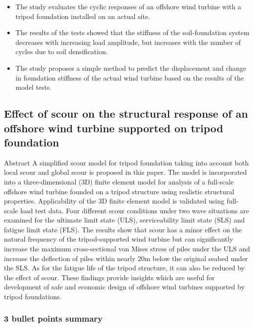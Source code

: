 \documentclass[
  letterpaper,
  DIV=11,
  numbers=noendperiod]{scrreprt}
\providecommand{\tightlist}{%
  \setlength{\itemsep}{0pt}\setlength{\parskip}{0pt}}\usepackage{longtable,booktabs,array}
\begin{document}
\begin{itemize}
\tightlist
\item
  The study evaluates the cyclic responses of an offshore wind turbine
  with a tripod foundation installed on an actual site.
\item
  The results of the tests showed that the stiffness of the
  soil-foundation system decreases with increasing load amplitude, but
  increases with the number of cycles due to soil densification.
\item
  The study proposes a simple method to predict the displacement and
  change in foundation stiffness of the actual wind turbine based on the
  results of the model tests.
\end{itemize}

\hypertarget{effect-of-scour-on-the-structural-response-of-an-offshore-wind-turbine-supported-on-tripod-foundation-1}{%
\subsection{Effect of scour on the structural response of an offshore
wind turbine supported on tripod
foundation}\label{effect-of-scour-on-the-structural-response-of-an-offshore-wind-turbine-supported-on-tripod-foundation-1}}

Abstract A simplified scour model for tripod foundation taking into
account both local scour and global scour is proposed in this paper. The
model is incorporated into a three-dimensional (3D) finite element model
for analysis of a full-scale offshore wind turbine founded on a tripod
structure using realistic structural properties. Applicability of the 3D
finite element model is validated using full-scale load test data. Four
different scour conditions under two wave situations are examined for
the ultimate limit state (ULS), serviceability limit state (SLS) and
fatigue limit state (FLS). The results show that scour has a minor
effect on the natural frequency of the tripod-supported wind turbine but
can significantly increase the maximum cross-sectional von Mises stress
of piles under the ULS and increase the deflection of piles within
nearly 20m below the original seabed under the SLS. As for the fatigue
life of the tripod structure, it can also be reduced by the effect of
scour. These findings provide insights which are useful for development
of safe and economic design of offshore wind turbines supported by
tripod foundations.

\hypertarget{bullet-points-summary-8}{%
\subsubsection{3 bullet points summary}\label{bullet-points-summary-8}}
\end{document}

